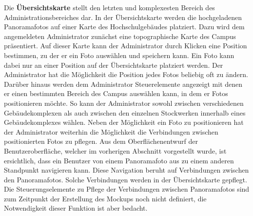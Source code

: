 Die \textbf{Übersichtskarte} stellt den letzten und komplexesten Bereich des
Administrationsbereiches dar. In der Übersichtskarte werden die hochgeladenen
Panoramafotos auf einer Karte des Hochschulgebäudes platziert. Dazu wird dem
angemeldeten Administrator zunächst eine topographische Karte des Campus
präsentiert. Auf dieser Karte kann der Administrator durch Klicken eine
Position bestimmen, zu der er ein Foto auswählen und speichern kann.
Ein Foto kann dabei nur an einer Position auf der Übersichtskarte platziert
werden. Der Administrator hat die Möglichkeit die Position jedes Fotos beliebig
oft zu ändern. Darüber hinaus werden dem Administrator Steuerelemente angezeigt
mit denen er einen bestimmten Bereich des Campus auswählen kann, in dem er
Fotos positionieren möchte. So kann der Administrator sowohl zwischen
verschiedenen Gebäudekomplexen als auch zwischen den einzelnen Stockwerken
innerhalb eines Gebäudekomplexes wählen. Neben der Möglichkeit ein Foto zu
positionieren hat der Administrator weiterhin die Möglichkeit die Verbindungen
zwischen positionierten Fotos zu pflegen. Aus dem Oberflächenentwurf der
Benutzeroberfläche, welcher im vorherigen Abschnitt vorgestellt wurde, ist
ersichtlich, dass ein Benutzer von einem Panoramafoto aus zu einem anderen
Standpunkt navigieren kann. Diese Navigation beruht auf Verbindungen zwischen
den Panoramafotos. Solche Verbindungen werden in der Übersichtskarte gepflegt.
Die Steuerungselemente zu Pflege der Verbindungen zwischen Panoramafotos sind zum
Zeitpunkt der Erstellung des Mockups noch nicht definiert, die Notwendigkeit
dieser Funktion ist aber bedacht.